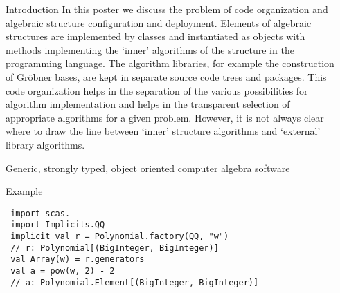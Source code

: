 \documentclass[final]{beamer}
\begin{document}
\begin{frame}[fragile]
\begin{columns}[t]
\begin{column}{.3\linewidth}
\begin{block}{\large Introduction}
In this poster we discuss the problem of code organization and
algebraic structure configuration and deployment. Elements of algebraic
structures are implemented by classes and instantiated as objects with
methods implementing the `inner' algorithms of the structure in the
programming language. The algorithm libraries, for example the
construction of Gr\"obner bases, are kept in separate source code trees
and packages. This code organization helps in the separation of the
various possibilities for algorithm implementation and helps in the
transparent selection of appropriate algorithms for a given problem.
However, it is not always clear where to draw the line between `inner'
structure algorithms and `external' library algorithms.
  \end{block}
  \hfill
  \begin{block}{\large Generic, strongly typed, object oriented computer algebra software}
      \centering
  \end{block}
  \hfill
  \begin{block}{\large Example}
\tiny 
\begin{lstlisting} 
 import scas._
 import Implicits.QQ
 implicit val r = Polynomial.factory(QQ, "w")
 // r: Polynomial[(BigInteger, BigInteger)]
 val Array(w) = r.generators
 val a = pow(w, 2) - 2 
 // a: Polynomial.Element[(BigInteger, BigInteger)]
\end{lstlisting} 
%
%
  \end{block}
\end{column}


\begin{column}{.3\linewidth}
 

\end{column}
\end{columns}
\end{frame}
\end{document}
